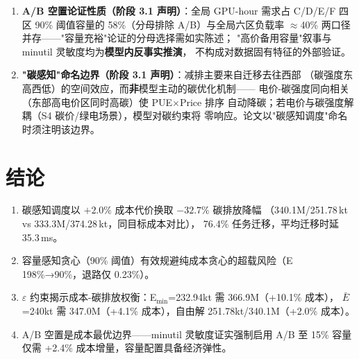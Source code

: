 \documentclass{internal-report}
\begin{document}
\begin{enumerate}
        （A 708.1 vs E 373.7 元/MWh），而逐时电价全域 235--1096 波动，区域内
        谷时电价可低于跨区均价。A/B 承接为 0 的结论建立在均价排序上，未做逐时
        口径复核（原假设检验 A3 状态"待补"）——结论强度相应降级为"均价口径下
        A/B 非首选目的地"，逐时复核留给 S4。
  \item \textbf{A/B 空置论证性质（阶段 3.1 声明）}：全局 GPU-hour 需求占
        C/D/E/F 四区 90\% 阈值容量的 58\%（分母排除 A/B）与全局六区负载率
        $\approx$40\% 两口径并存——"容量充裕"论证的分母选择需如实陈述；
        "高价备用容量"叙事与 minutil 灵敏度均为\textbf{模型内反事实推演}，
        不构成对数据固有特征的外部验证。
  \item \textbf{"碳感知"命名边界（阶段 3.1 声明）}：减排主要来自迁移去往西部
        （碳强度东高西低）的空间效应，而\textbf{非}模型主动的碳优化机制——
        电价-碳强度同向相关（东部高电价区同时高碳）使 PUE$\times$Price 排序
        自动降碳；若电价与碳强度解耦（S4 碳价/绿电场景），模型对碳约束将
        零响应。论文以"碳感知调度"命名时须注明该边界。
\end{enumerate}

\section{结论}

\begin{enumerate}
  \item 碳感知调度以 $+2.0\%$ 成本代价换取 $-32.7\%$ 碳排放降幅
        （340.1M/251.78\,kt vs 333.3M/374.28\,kt，同目标成本对比），
        76.4\% 任务迁移，平均迁移时延 35.3\,ms。
  \item 容量感知贪心（90\% 阈值）有效规避纯成本贪心的超载风险（E 198\%→90\%，退路仅 0.23\%）。
  \item $\varepsilon$ 约束揭示成本-碳排放权衡：E$_{\text{min}}$=232.94kt 需 366.9M（+10.1\% 成本），
        $\bar{E}$=240kt 需 347.0M（+4.1\% 成本），自由解 251.78kt/340.1M（+2.0\% 成本）。
  \item A/B 空置是成本最优边界——minutil 灵敏度证实强制启用 A/B 至 15\% 容量
        仅需 +2.4\% 成本增量，容量配置具备经济弹性。
\end{enumerate}
\end{document}
